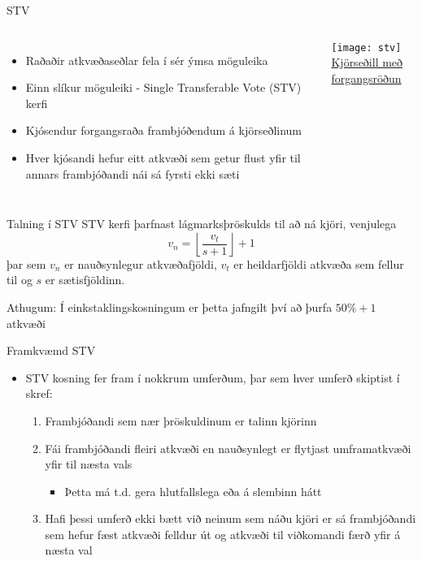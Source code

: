 \documentclass{beamer}
\begin{document}
\begin{frame}{STV}
    \begin{columns}
        \begin{itemize}
            \item Raðaðir atkvæðaseðlar fela í sér ýmsa möguleika
            \item Einn slíkur möguleiki - Single Transferable Vote (STV) kerfi
            \item Kjósendur forgangsraða frambjóðendum á kjörseðlinum
            \item Hver kjósandi hefur eitt atkvæði sem getur flust yfir til annars frambjóðandi nái sá fyrsti ekki sæti
        \end{itemize}
        \begin{center}
            \texttt{[image: stv]}
            \\
            \href{https://upload.wikimedia.org/wikipedia/commons/thumb/1/18/Preferential\_ballot.svg/593px-Preferential\_ballot.svg.png}{Kjörseðill með forgangsröðun}
        \end{center}
    \end{columns}
\end{frame}

\begin{frame}{Talning í STV}
    STV kerfi þarfnast lágmarksþröskulds til að ná kjöri, venjulega
    \[
        v_n = \left \lfloor \frac{v_t}{s+1} \right \rfloor+1
    \]
    þar sem $v_n$ er nauðsynlegur atkvæðafjöldi, $v_t$ er heildarfjöldi atkvæða sem fellur til og $s$ er sætisfjöldinn.

    \vspace{0.5cm}
    Athugum: Í einkstaklingskosningum er þetta jafngilt því að þurfa $50\%+1$ atkvæði
\end{frame}

\begin{frame}{Framkvæmd STV}
    \begin{itemize}
        \item STV kosning fer fram í nokkrum umferðum, þar sem hver umferð skiptist í skref:
        \begin{enumerate}
            \item Frambjóðandi sem nær þröskuldinum er talinn kjörinn
            \item Fái frambjóðandi fleiri atkvæði en nauðsynlegt er flytjast umframatkvæði yfir til næsta vals 
            \begin{itemize}
                \item Þetta má t.d. gera hlutfallslega eða á slembinn hátt
            \end{itemize}
            \item Hafi þessi umferð ekki bætt við neinum sem náðu kjöri er sá frambjóðandi sem hefur fæst atkvæði felldur út og atkvæði til viðkomandi færð yfir á næsta val
        \end{enumerate}
    \end{itemize}
\end{frame}
\end{document}
